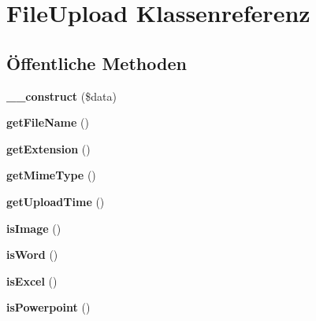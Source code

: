 \hypertarget{class_file_upload}{}\section{File\+Upload Klassenreferenz}
\label{class_file_upload}
\subsection*{Öffentliche Methoden}
\begin{DoxyCompactItemize}
\item 
\mbox{\label{class_file_upload_a9dbebfa744b707a4a4323caea963bac6}} 
{\bfseries \+\_\+\+\_\+construct} (\$data)
\item 
\mbox{\label{class_file_upload_ab119c690f92d63f6e85901bf7c97c585}} 
{\bfseries get\+File\+Name} ()
\item 
\mbox{\label{class_file_upload_a10d3a3ac11769186041e171f95af266e}} 
{\bfseries get\+Extension} ()
\item 
\mbox{\label{class_file_upload_a8676285b7067b17b25ebfeb638ab8194}} 
{\bfseries get\+Mime\+Type} ()
\item 
\mbox{\label{class_file_upload_ad5f8137f2e74384691b81786cb123abc}} 
{\bfseries get\+Upload\+Time} ()
\item 
\mbox{\label{class_file_upload_a7617d7d33e575830e2702d4016c145e3}} 
{\bfseries is\+Image} ()
\item 
\mbox{\label{class_file_upload_aa038b242939a64d1a9613273374c4b84}} 
{\bfseries is\+Word} ()
\item 
\mbox{\label{class_file_upload_a4f422035d99a77d3065ebf7972b24d9c}} 
{\bfseries is\+Excel} ()
\item 
\mbox{\label{class_file_upload_a1dd223a53a2b7dceacbb30682ba864fd}} 
{\bfseries is\+Powerpoint} ()
\item 
\mbox{\label{class_file_upload_a9d8dd8cc269e2d7dce8a3d5671437ee3}} 

\end{DoxyCompactItemize}
